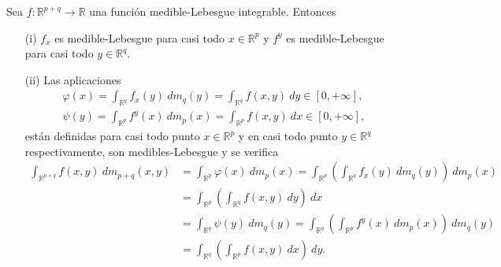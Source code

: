 \begin{teo}
Sea $f: \mathbb{R}^{p+q} \longrightarrow \mathbb{R}$ una función medible-Lebesgue integrable. Entonces
\begin{enumerate}
    \item[(i)] $f_x$ es medible-Lebesgue para casi todo $x \in \mathbb{R}^p$ y $f^y$ es medible-Lebesgue para casi todo $y \in \mathbb{R}^q$.
    \item[(ii)] Las aplicaciones
    \begin{align*}
        \varphi(x) = \int_{\mathbb{R}^q}{f_x(y) \ dm_q(y)} = \int_{\mathbb{R}^q}{f(x,y) \ dy} \in [0,+\infty],\\
        \psi(y) = \int_{\mathbb{R}^p}{f^y(x) \ dm_p(x)} = \int_{\mathbb{R}^p}{f(x,y) \ dx} \in [0,+\infty],
    \end{align*}
    están definidas para casi todo punto $x \in \mathbb{R}^{p}$ y en casi todo punto $y \in \mathbb{R}^{q}$ respectivamente, son medibles-Lebesgue y se verifica
    \begin{align*}
        \int_{\mathbb{R}^{p+q}}{f(x,y) \ dm_{p+q}(x,y)} &= \int_{\mathbb{R}^p}{\varphi(x) \ dm_p(x)} = \int_{\mathbb{R}^p}\left( \int_{\mathbb{R}^q}{f_x(y) \ dm_q(y)} \right) \ dm_p(x) \\
        &= \int_{\mathbb{R}^p}\left( \int_{\mathbb{R}^q}{f(x,y) \ dy} \right) \ dx \\
        &= \int_{\mathbb{R}^q}{\psi(y) \ dm_q(y)} = \int_{\mathbb{R}^q}\left( \int_{\mathbb{R}^p}{f^y(x) \ dm_p(x)} \right) \ dm_q(y)\\
        &= \int_{\mathbb{R}^q}\left( \int_{\mathbb{R}^p}{f(x,y) \ dx} \right) \ dy.
    \end{align*}
\end{enumerate}
\end{teo}